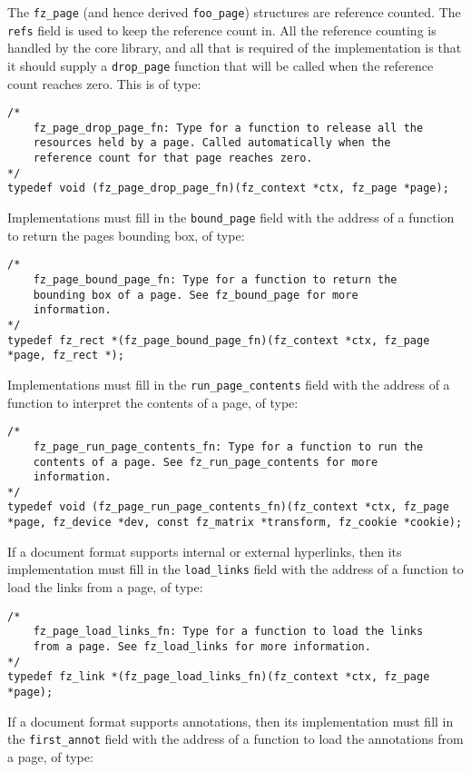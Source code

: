 \documentclass[oneside]{book}
\begin{document}
The \texttt{fz\_page} (and hence derived \texttt{foo\_page}) structures are reference counted. The \texttt{refs} field is used to keep the reference count in. All the reference counting is handled by the core library, and all that is required of the implementation is that it should supply a \texttt{drop\_page} function that will be called when the reference count reaches zero. This is of type:

\begin{lstlisting}
/*
	fz_page_drop_page_fn: Type for a function to release all the
	resources held by a page. Called automatically when the
	reference count for that page reaches zero.
*/
typedef void (fz_page_drop_page_fn)(fz_context *ctx, fz_page *page);
\end{lstlisting}

Implementations must fill in the \texttt{bound\_page} field with the address of a function to return the pages bounding box, of type:

\begin{lstlisting}
/*
	fz_page_bound_page_fn: Type for a function to return the
	bounding box of a page. See fz_bound_page for more
	information.
*/
typedef fz_rect *(fz_page_bound_page_fn)(fz_context *ctx, fz_page *page, fz_rect *);
\end{lstlisting}

Implementations must fill in the \texttt{run\_page\_contents} field with the address of a function to interpret the contents of a page, of type:

\begin{lstlisting}
/*
	fz_page_run_page_contents_fn: Type for a function to run the
	contents of a page. See fz_run_page_contents for more
	information.
*/
typedef void (fz_page_run_page_contents_fn)(fz_context *ctx, fz_page *page, fz_device *dev, const fz_matrix *transform, fz_cookie *cookie);
\end{lstlisting}

If a document format supports internal or external hyperlinks, then its implementation must fill in the \texttt{load\_links} field with the address of a function to load the links from a page, of type:

\begin{lstlisting}
/*
	fz_page_load_links_fn: Type for a function to load the links
	from a page. See fz_load_links for more information.
*/
typedef fz_link *(fz_page_load_links_fn)(fz_context *ctx, fz_page *page);
\end{lstlisting}

If a document format supports annotations, then its implementation must fill in the \texttt{first\_annot} field with the address of a function to load the annotations from a page, of type:
\end{document}
